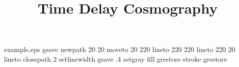 %
\begin{filecontents*}{example.eps}
gsave
newpath
  20 20 moveto
  20 220 lineto
  220 220 lineto
  220 20 lineto
closepath
2 setlinewidth
gsave
  .4 setgray fill
grestore
stroke
grestore
\end{filecontents*}
%
\RequirePackage{fix-cm}
%
\documentclass[smallextended]{svjour3}       %
%
\smartqed  %
%
%
%
\usepackage{graphicx}
\usepackage[round]{natbib}
\usepackage{amssymb,amsmath}
%
\newcommand{\mnras}{MNRAS}
\newcommand{\nat}{Nature}
\newcommand{\aap}{A\&A}
\newcommand{\apj}{ApJ}
\newcommand{\apjl}{ApJL}
\newcommand{\apjs}{ApJS}
\newcommand{\jcap}{JCAP}
\newcommand{\physrep}{Phys.Rep.}
\newcommand{\prd}{Phys.Rev.D}
\newcommand{\araa}{ARA\&A}
\newcommand{\Ddt}{D_{\Delta{\rm t}}}
\newcommand{\Dd}{D_{\rm d}}
\newcommand{\Ds}{D_{\rm s}}
\newcommand{\Dds}{D_{\rm ds}}
\newcommand{\zd}{z_{\rm d}}
\newcommand{\zs}{z_{\rm s}}
\newcommand{\cospars}{\boldsymbol{\Omega}}
\newcommand{\Ok}{\Omega_{\rm k}}
\newcommand{\ODE}{\Omega_{\rm DE}}
\newcommand{\wDE}{w_0}
\newcommand{\x}{\boldsymbol{\theta}}
\newcommand{\y}{\boldsymbol{\beta}}
\newcommand{\grad}{\boldsymbol{\nabla}}
\newcommand{\deflectionangle}{\boldsymbol{\alpha}}
%
%



\title{Time Delay Cosmography%
}


